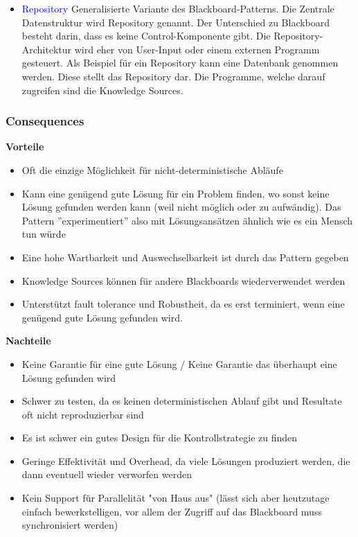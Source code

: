 \begin{itemize}
    \item \textcolor{blue}{Repository} Generalisierte Variante des Blackboard-Patterns. Die Zentrale Datenstruktur wird Repository genannt. Der Unterschied zu Blackboard besteht darin, dass es keine Control-Komponente gibt. Die Repository-Architektur wird eher von User-Input oder einem externen Programm gesteuert. Als Beispiel für ein Repository kann eine Datenbank genommen werden. Diese stellt das Repository dar. Die Programme, welche darauf zugreifen sind die Knowledge Sources.
\end{itemize}

\subsubsection{Consequences}

\textbf{Vorteile}

\begin{itemize}
    \item Oft die einzige Möglichkeit für nicht-deterministische Abläufe
    \item Kann eine genügend gute Lösung für ein Problem finden, wo sonst keine Lösung gefunden werden kann (weil nicht möglich oder zu aufwändig). Das Pattern ''experimentiert'' also mit Lösungsansätzen ähnlich wie es ein Mensch tun würde
    \item Eine hohe Wartbarkeit und Auswechselbarkeit ist durch das Pattern gegeben
    \item Knowledge Sources können für andere Blackboards wiederverwendet werden
    \item Unterstützt fault tolerance und Robustheit, da es erst terminiert, wenn eine genügend gute Lösung gefunden wird.
\end{itemize}
\vspace{10pt}
\textbf{Nachteile}

\begin{itemize}
    \item Keine Garantie für eine gute Lösung / Keine Garantie das überhaupt eine Lösung gefunden wird
    \item Schwer zu testen, da es keinen deterministischen Ablauf gibt und Resultate oft nicht reproduzierbar sind
    \item Es ist schwer ein gutes Design für die Kontrollstrategie zu finden
    \item Geringe Effektivität und Overhead, da viele Lösungen produziert werden, die dann eventuell wieder verworfen werden
    \item Kein Support für Parallelität "von Haus aus" (lässt sich aber heutzutage einfach bewerkstelligen, vor allem der Zugriff auf das Blackboard muss synchronisiert werden)
\end{itemize}

